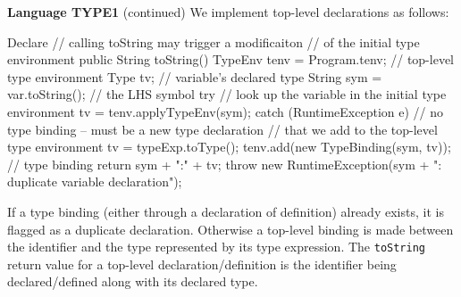 \begin{minipage}[t]{\sw}
\slidenumber
\LARGE
{\bf Language TYPE1} (continued)\exx
\Large
We implement top-level declarations as follows:
\large
\begin{qv}
Declare
    // calling toString may trigger a modificaiton
    // of the initial type environment
    public String toString() {
        TypeEnv tenv = Program.tenv; // top-level type environment
        Type tv; // variable's declared type
        String sym = var.toString(); // the LHS symbol
        try {
            // look up the variable in the initial type environment
            tv = tenv.applyTypeEnv(sym);
        } catch (RuntimeException e) {
            // no type binding -- must be a new type declaration
            // that we add to the top-level type environment
            tv = typeExp.toType();
            tenv.add(new TypeBinding(sym, tv)); // type binding
            return sym + ":" + tv;
        }
        throw new RuntimeException(sym + ": duplicate variable declaration");
    }
\end{qv}
\Large
If a type binding
(either through a declaration of definition)
already exists, it is flagged as a duplicate declaration.
Otherwise a top-level binding is made
between the identifier and the type represented
by its type expression.
The \verb'toString' return value for a top-level declaration/definition
is the identifier being declared/defined along with its declared type.
\end{minipage}
